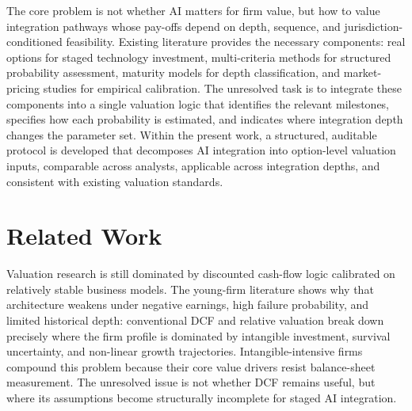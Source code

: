 \documentclass[oneside,10pt]{swissi}
\begin{document}
The core problem is not whether AI matters for firm value, but how to value integration pathways whose pay-offs depend on depth, sequence, and jurisdiction-conditioned feasibility. Existing literature provides the necessary components: real options for staged technology investment, multi-criteria methods for structured probability assessment, maturity models for depth classification, and market-pricing studies for empirical calibration.\cite{schwartz2000internet,benaroch1999isre,saaty1980ahp,hansen2024aicmm,eisfeldt2023firmvalues} The unresolved task is to integrate these components into a single valuation logic that identifies the relevant milestones, specifies how each probability is estimated, and indicates where integration depth changes the parameter set. Within the present work, a structured, auditable protocol is developed that decomposes AI integration into option-level valuation inputs, comparable across analysts, applicable across integration depths, and consistent with existing valuation standards.

\section{Related Work}

Valuation research is still dominated by discounted cash-flow logic calibrated on relatively stable business models.\cite{koller2020valuation} The young-firm literature shows why that architecture weakens under negative earnings, high failure probability, and limited historical depth: conventional DCF and relative valuation break down precisely where the firm profile is dominated by intangible investment, survival uncertainty, and non-linear growth trajectories.\cite{damodaran2018darkside,damodaran2009young} Intangible-intensive firms compound this problem because their core value drivers resist balance-sheet measurement.\cite{lev2001intangibles,haskel2017capitalism} The unresolved issue is not whether DCF remains useful, but where its assumptions become structurally incomplete for staged AI integration.
\end{document}
